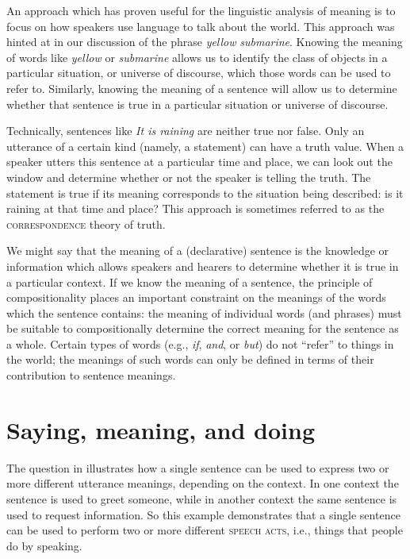 An approach which has proven useful for the linguistic analysis of meaning is to focus on how speakers use language to talk about the world. This approach was hinted at in our discussion of the phrase \textit{yellow} \textit{submarine}. Knowing the meaning of words like \textit{yellow} or \textit{submarine} allows us to identify the class of objects in a particular situation, or universe of discourse, which those words can be used to refer to. Similarly, knowing the meaning of a sentence will allow us to determine whether that sentence is true in a particular situation or universe of discourse.



Technically, sentences like \textit{It is raining} are neither true nor false. Only an utterance of a certain kind (namely, a statement) can have a truth value. When a speaker utters this sentence at a particular time and place, we can look out the window and determine whether or not the speaker is telling the truth. The statement is true if its meaning corresponds to the situation being described: is it raining at that time and place? This approach is sometimes referred to as the \textsc{correspondence} theory of truth.



We might say that the meaning of a (declarative) sentence is the knowledge or information which allows speakers and hearers to determine whether it is true in a particular context. If we know the meaning of a sentence, the principle of compositionality places an important constraint on the meanings of the words which the sentence contains: the meaning of individual words (and phrases) must be suitable to compositionally determine the correct meaning for the sentence as a whole. Certain types of words (e.g., \textit{if}, \textit{and}, or \textit{but}) do not “refer” to things in the world; the meanings of such words can only be defined in terms of their contribution to sentence meanings.


\section{Saying, meaning, and doing}\label{sec:1.5}

The  question in  illustrates how a single sentence can be used to express two or more different utterance meanings, depending on the context. In one context the sentence is used to greet someone, while in another context the same sentence is used to request information. So this example demonstrates that a single sentence can be used to perform two or more different \textsc{speech acts}, i.e., things that people do by speaking.



